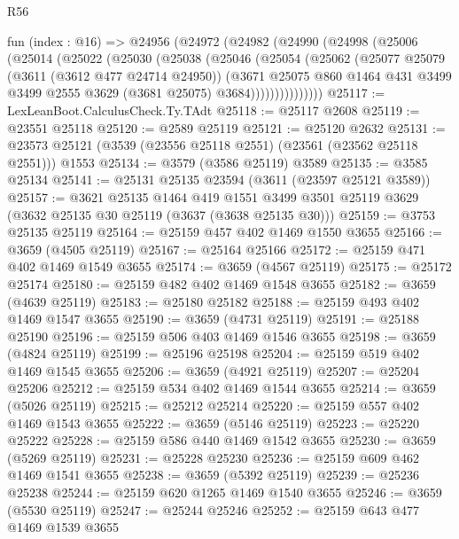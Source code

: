 \begin{lexlean}{R56}
\begin{coremodule}
    fun (index : @16) =>
    @24956
      (@24972
        (@24982
          (@24990
            (@24998
              (@25006
                (@25014
                  (@25022
                    (@25030
                      (@25038
                        (@25046
                          (@25054
                            (@25062
                              (@25077
                                @25079
                                (@3611 (@3612 @477 @24714 @24950))
                                (@3671
                                  @25075
                                  @860
                                  @1464
                                  @431
                                  @3499
                                  @3499
                                  @2555
                                  @3629
                                  (@3681 @25075)
                                  @3684)))))))))))))))
@25117 := LexLeanBoot.CalculusCheck.Ty.TAdt
@25118 := @25117 @2608
@25119 := @23551 @25118
@25120 := @2589 @25119
@25121 := @25120 @2632
@25131 := @23573 @25121 (@3539 (@23556 @25118 @2551) (@23561 (@23562 @25118 @2551))) @1553
@25134 := @3579 (@3586 @25119) @3589
@25135 := @3585 @25134
@25141 := @25131 @25135 @23594 (@3611 (@23597 @25121 @3589))
@25157 := @3621
    @25135
    @1464
    @419
    @1551
    @3499
    @3501
    @25119
    @3629
    (@3632 @25135 @30 @25119 (@3637 (@3638 @25135 @30)))
@25159 := @3753 @25135 @25119
@25164 := @25159 @457 @402 @1469 @1550 @3655
@25166 := @3659 (@4505 @25119)
@25167 := @25164 @25166
@25172 := @25159 @471 @402 @1469 @1549 @3655
@25174 := @3659 (@4567 @25119)
@25175 := @25172 @25174
@25180 := @25159 @482 @402 @1469 @1548 @3655
@25182 := @3659 (@4639 @25119)
@25183 := @25180 @25182
@25188 := @25159 @493 @402 @1469 @1547 @3655
@25190 := @3659 (@4731 @25119)
@25191 := @25188 @25190
@25196 := @25159 @506 @403 @1469 @1546 @3655
@25198 := @3659 (@4824 @25119)
@25199 := @25196 @25198
@25204 := @25159 @519 @402 @1469 @1545 @3655
@25206 := @3659 (@4921 @25119)
@25207 := @25204 @25206
@25212 := @25159 @534 @402 @1469 @1544 @3655
@25214 := @3659 (@5026 @25119)
@25215 := @25212 @25214
@25220 := @25159 @557 @402 @1469 @1543 @3655
@25222 := @3659 (@5146 @25119)
@25223 := @25220 @25222
@25228 := @25159 @586 @440 @1469 @1542 @3655
@25230 := @3659 (@5269 @25119)
@25231 := @25228 @25230
@25236 := @25159 @609 @462 @1469 @1541 @3655
@25238 := @3659 (@5392 @25119)
@25239 := @25236 @25238
@25244 := @25159 @620 @1265 @1469 @1540 @3655
@25246 := @3659 (@5530 @25119)
@25247 := @25244 @25246
@25252 := @25159 @643 @477 @1469 @1539 @3655

\end{coremodule}
\end{lexlean}
